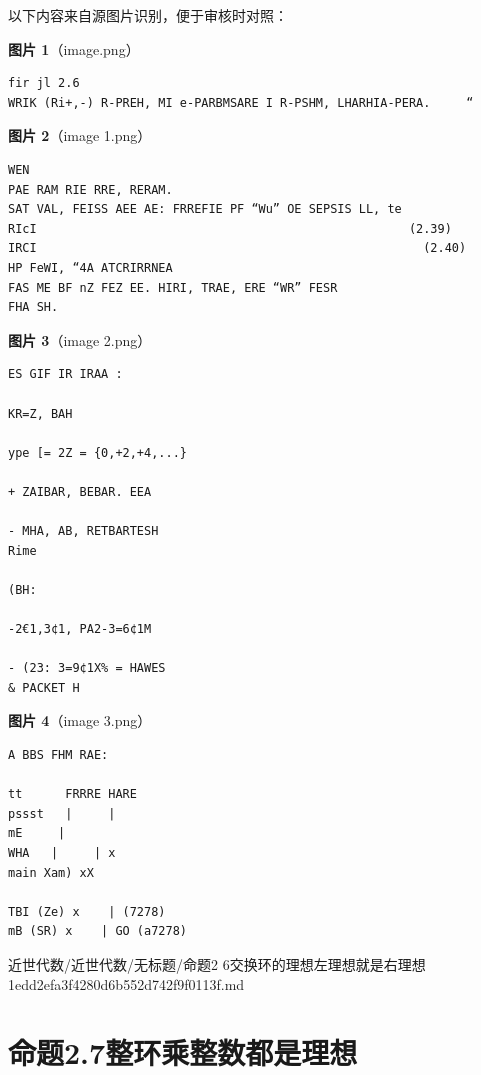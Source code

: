 \begin{note}
以下内容来自源图片识别，便于审核时对照：

\textbf{图片 1}（image.png）
\begin{Verbatim}[fontsize=\small]
fir jl 2.6
WRIK (Ri+,-) R-PREH, MI e-PARBMSARE I R-PSHM, LHARHIA-PERA.     “
\end{Verbatim}

\textbf{图片 2}（image 1.png）
\begin{Verbatim}[fontsize=\small]
WEN
PAE RAM RIE RRE, RERAM.
SAT VAL, FEISS AEE AE: FRREFIE PF “Wu” OE SEPSIS LL, te
RIcI                                                    (2.39)
IRCI                                                      (2.40)
HP FeWI, “4A ATCRIRRNEA
FAS ME BF nZ FEZ EE. HIRI, TRAE, ERE “WR” FESR
FHA SH.
\end{Verbatim}

\textbf{图片 3}（image 2.png）
\begin{Verbatim}[fontsize=\small]
ES GIF IR IRAA :

KR=Z, BAH

ype [= 2Z = {0,+2,+4,...}

+ ZAIBAR, BEBAR. EEA

- MHA, AB, RETBARTESH
Rime

(BH:

-2€1,3¢1, PA2-3=6¢1M

- (23: 3=9¢1X% = HAWES
& PACKET H
\end{Verbatim}

\textbf{图片 4}（image 3.png）
\begin{Verbatim}[fontsize=\small]
A BBS FHM RAE:

tt      FRRRE HARE
pssst   |     |
mE     |
WHA   |     | x
main Xam) xX

TBI (Ze) x    | (7278)
mB (SR) x    | GO (a7278)
\end{Verbatim}

\end{note}

\begin{note}[来源路径]

近世代数/近世代数/无标题/命题2 6交换环的理想左理想就是右理想 1edd2efa3f4280d6b552d742f9f0113f.md

\end{note}

\section*{命题2.7整环乘整数都是理想}

